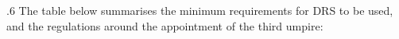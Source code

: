\documentclass[12pt]{article}
\begin{document}
\vspace{\baselineskip}
\begin{adjustwidth}{0.5in}{0.12in}
{\fontsize{9pt}{10.8pt}.6 \tabto{0.49in} The table below summarises the minimum requirements for DRS to be used, and the regulations around the appointment of the third umpire:\par}\par

\end{adjustwidth}

\par 

\vspace{\baselineskip}


\end{document}
